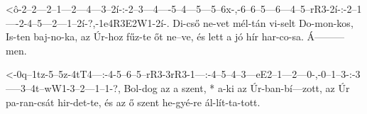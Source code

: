 

  {<ô-2--2---2--1---2---4---3--2í-:-2--3---4----5--4---5---5--6x-,-6--6--5---6---4--5--rR3-2í-:-2--1----2-4--5---2---1--2í-?,-1e4R3E2W1-2í-.}
  {   Di-cső ne-vet mél-tán vi-selt Do-mon-kos, Is-ten baj-no-ka,  az Úr-hoz fűz-te őt ne--ve,  és lett a jó hír har-co-sa.   Á---------men.}

  {<-0q--1tz-5--5z-4tT4---:-4-5--6--5--rR3-3rR3-1---:-4--5--4--3---eE2--1---2---0-,-0--1--3-:-3-----3--4t--wW1-3--2---1--1-?,}
  {  Bol-dog az a  szent, * a-ki az Úr-ban-bí---zott, az Úr pa-ran-csát hir-det-te, és az ő   szent he-gyé-re  ál-lít-ta-tott.}

